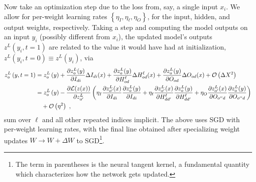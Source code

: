 \documentclass[11pt]{article}
\begin{document}
Now take an optimization step due to the loss from, say, a single input $ x_{ i } $. We allow for
per-weight learning rates $ \left \{ \eta_{ I }, \eta_{ \ell }, \eta_{ O } \right \} $, for the
input, hidden, and output weights, respectively.  Taking a step and computing the model outputs on
an input $ y_{ i } $ (possibly different from $ x_{ i } $), the updated model's outputs $ z^{ L
}\left ( y_{ i }, t=1 \right ) $ are related to the value it would have had at
initialization, $ z^{ L }\left ( y_{ i }, t=0 \right )\equiv z^{ L }\left ( y_{ i } \right ) $, via
\begin{align}
    z^{ L }_{ o }\left ( y, t=1 \right ) &=  z^{ L }_{ o }\left ( y \right )
    + \frac{ \partial z^{ L }_{ o }(y) }{ \partial I_{ di } } \Delta I_{ di }(x)
    + \frac{ \partial z^{ L }_{ o }(y) }{ \partial H^{ \ell }_{ od } } \Delta H^{ \ell }_{ od }(x)
    + \frac{ \partial z^{ L }_{ o }(y) }{ \partial O_{ od } } \Delta O_{ od }(x)+\mathcal{O} \left( \Delta X^{ 2 } \right) \nonumber\\
   &=  z^{ L }_{ o }\left ( y \right )
    - \frac{ \partial \mathcal{L}(z(x)) }{\partial z ^{ L }_{ o' }  }\left( \eta_{ I } \frac{ \partial z ^{ L }_{ o' }(x) }{ \partial I_{ di } }\frac{ \partial z^{ L }_{ o }(y) }{ \partial I_{ di } }
    + \eta_{ \ell }\frac{ \partial z ^{ L }_{ o' }(x) }{ \partial H^{ \ell }_{ dd' } }\frac{ \partial z^{ L }_{ o }(y) }{ \partial H^{ \ell }_{ dd' } }
    + \eta_{ O }\frac{ \partial z ^{ L }_{ o' }(x) }{ \partial O_{ o''d } }\frac{ \partial z^{ L }_{ o }(y) }{ \partial O_{ o''d  } } \right ) \nonumber\\
    & \quad+\mathcal{O} \left( \eta^{ 2 } \right)  \ ,
    \label{app_eq_general_output_update}
\end{align}
sum over $ \ell $ and all other repeated indices implicit. The above uses SGD with per-weight
learning rates, with the final line obtained after specializing weight updates $ W
\longrightarrow W + \Delta W $ to SGD\footnote{The term in parentheses is the neural tangent kernel,
a fundamental quantity which characterizes how the network gets updated.}.
\end{document}
